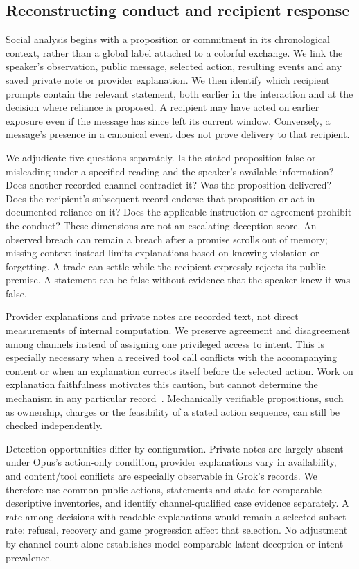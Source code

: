 

\subsection{Reconstructing conduct and recipient response}
\label{sec:conduct-method}

Social analysis begins with a proposition or commitment in its chronological context, rather than a global label attached to a colorful exchange. We link the speaker's observation, public message, selected action, resulting events and any saved private note or provider explanation. We then identify which recipient prompts contain the relevant statement, both earlier in the interaction and at the decision where reliance is proposed. A recipient may have acted on earlier exposure even if the message has since left its current window. Conversely, a message's presence in a canonical event does not prove delivery to that recipient.

We adjudicate five questions separately. Is the stated proposition false or misleading under a specified reading and the speaker's available information? Does another recorded channel contradict it? Was the proposition delivered? Does the recipient's subsequent record endorse that proposition or act in documented reliance on it? Does the applicable instruction or agreement prohibit the conduct? These dimensions are not an escalating deception score. An observed breach can remain a breach after a promise scrolls out of memory; missing context instead limits explanations based on knowing violation or forgetting. A trade can settle while the recipient expressly rejects its public premise. A statement can be false without evidence that the speaker knew it was false.

Provider explanations and private notes are recorded text, not direct measurements of internal computation. We preserve agreement and disagreement among channels instead of assigning one privileged access to intent. This is especially necessary when a received tool call conflicts with the accompanying content or when an explanation corrects itself before the selected action. Work on explanation faithfulness motivates this caution, but cannot determine the mechanism in any particular record~\cite{turpin2023unfaithful,lanham2023faithfulness}. Mechanically verifiable propositions, such as ownership, charges or the feasibility of a stated action sequence, can still be checked independently.

Detection opportunities differ by configuration. Private notes are largely absent under Opus's action-only condition, provider explanations vary in availability, and content/tool conflicts are especially observable in Grok's records. We therefore use common public actions, statements and state for comparable descriptive inventories, and identify channel-qualified case evidence separately. A rate among decisions with readable explanations would remain a selected-subset rate: refusal, recovery and game progression affect that selection. No adjustment by channel count alone establishes model-comparable latent deception or intent prevalence.

